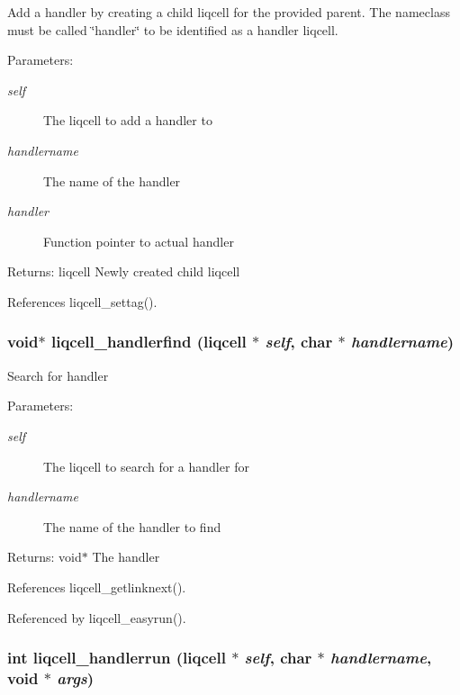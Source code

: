 Add a handler by creating a child liqcell for the provided parent. The nameclass must be called \char`\"{}handler\char`\"{} to be identified as a handler liqcell.

\begin{Desc}
\item[Parameters:]
\begin{description}
\item[{\em self}]The liqcell to add a handler to \item[{\em handlername}]The name of the handler \item[{\em handler}]Function pointer to actual handler \end{description}
\end{Desc}
\begin{Desc}
\item[Returns:]liqcell Newly created child liqcell \end{Desc}


References liqcell\_\-settag().
\subsubsection[{liqcell\_\-handlerfind}]{\setlength{\rightskip}{0pt plus 5cm}void$\ast$ liqcell\_\-handlerfind (liqcell $\ast$ {\em self}, \/  char $\ast$ {\em handlername})}\label{d5/da2/liqcell_8c_3f49c14107f46d1dce77603abc583cef}


Search for handler \begin{Desc}
\item[Parameters:]
\begin{description}
\item[{\em self}]The liqcell to search for a handler for \item[{\em handlername}]The name of the handler to find \end{description}
\end{Desc}
\begin{Desc}
\item[Returns:]void$\ast$ The handler \end{Desc}


References liqcell\_\-getlinknext().

Referenced by liqcell\_\-easyrun().
\subsubsection[{liqcell\_\-handlerrun}]{\setlength{\rightskip}{0pt plus 5cm}int liqcell\_\-handlerrun (liqcell $\ast$ {\em self}, \/  char $\ast$ {\em handlername}, \/  void $\ast$ {\em args})}\label{d5/da2/liqcell_8c_188ff9834000eb5e0ac59505019165ab}



